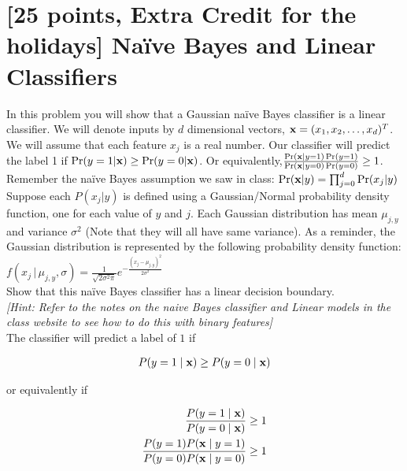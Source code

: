 \section{[25 points, Extra Credit for the holidays] Na\"ive Bayes and Linear Classifiers }
\label{sec:q1}


In this problem you will show that a Gaussian na\"ive Bayes classifier is a linear classifier. We will denote inputs by $d$ dimensional vectors, ${\bf x} = (x_1, x_2,\dots, x_d)^T$. We will assume that each feature $x_j$ is a real number. Our classifier will predict the label 1 if $\Pr(y=1|{\bf x}) \geq \Pr(y=0|{\bf x})$. Or equivalently,$\frac{\Pr({\bf x} | y=1)\Pr(y=1)}{\Pr({\bf x} | y=0)\Pr(y=0)} \geq 1$. Remember the na\"ive Bayes assumption we saw in class: $\Pr({\bf x}|y) = \prod_{j=0}^{d}\Pr(x_j|y)$\\

Suppose each $P(x_j|y)$ is defined using a Gaussian/Normal probability density function, one for each value of $y$ and $j$. Each Gaussian distribution has mean $\mu_{j,y}$ and variance $\sigma^2$ (Note that they will all have same variance). As a reminder, the Gaussian distribution is represented by the following probability density function:$f(x_j\,|\,\mu_{j,y}, \sigma) = \frac{1}{\sqrt{2\sigma^2\pi}}e^{-\frac{(x_j-\mu_{j,y})^2}{2\sigma^2}}$\\

Show that this na\"ive Bayes classifier has a linear decision boundary.\\ \textit{[Hint: Refer to the notes on the naive Bayes classifier and Linear models in the class website to see how to do this with binary features]}\\

The classifier will predict a label of $1$ if 

\begin{equation*}
\begin{aligned}
P(y=1 \mid {\bf x}) \geq P(y=0 \mid {\bf x})
\end{aligned}
\end{equation*}

or equivalently if

\begin{equation*}
\begin{aligned}
\frac{P(y=1 \mid {\bf x}) }{ P(y=0 \mid {\bf x})} \geq 1\\
\frac{P(y=1) P({\bf x}  \mid y=1) }{ P(y=0) P({\bf x} \mid y=0)} \geq 1
\end{aligned}
\end{equation*}

